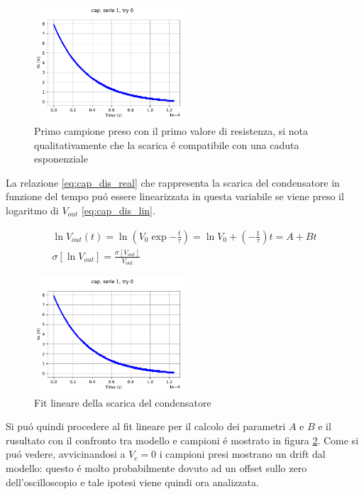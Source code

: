 \documentclass{article}
\begin{document}
\begin{figure}[h]
    \centering
    \includegraphics[width = 0.5\textwidth]{capserie1try0.pdf}
    \caption{Primo campione preso con il primo valore di resistenza, si nota qualitativamente che la scarica \'e compatibile con una caduta esponenziale}
    \label{fig:cap_dis_ex}
\end{figure}

La relazione \ref{eq:cap_dis_real} che rappresenta la scarica del condensatore in funzione del tempo pu\'o essere linearizzata in questa variabile se viene preso il logaritmo di $V_{out}$ \ref{eq:cap_dis_lin}.

\begin{gather}
	\ln{V_{out}(t)} = \ln{ \left( V_0 \exp{ -\frac{t}{\tau} } \right) } = \ln{V_0} + \left( -\frac{1}{\tau} \right) t = A + B t \\
	\sigma[\ln{V_{out}}]=\frac{\sigma[V_{out}]}{V_{out}}
	\label{eq:cap_dis_lin}
\end{gather}

\begin{figure}[h]
    \centering
    \includegraphics[width = 0.5\textwidth]{capserie1try0.pdf}
    \caption{Fit lineare della scarica del condensatore}
    \label{fig:cap_dis_ex_lin}
\end{figure}

Si pu\'o quindi procedere al fit lineare per il calcolo dei parametri $A$ e $B$ e il rusultato con il confronto tra modello e campioni \'e mostrato in figura \ref{fig:cap_dis_ex_lin}. Come si pu\'o vedere, avvicinandosi a $V_c = 0$ i campioni presi mostrano un drift dal modello: questo \'e molto probabilmente dovuto ad un offset sullo zero dell'oscilloscopio e tale ipotesi viene quindi ora analizzata.
\end{document}
